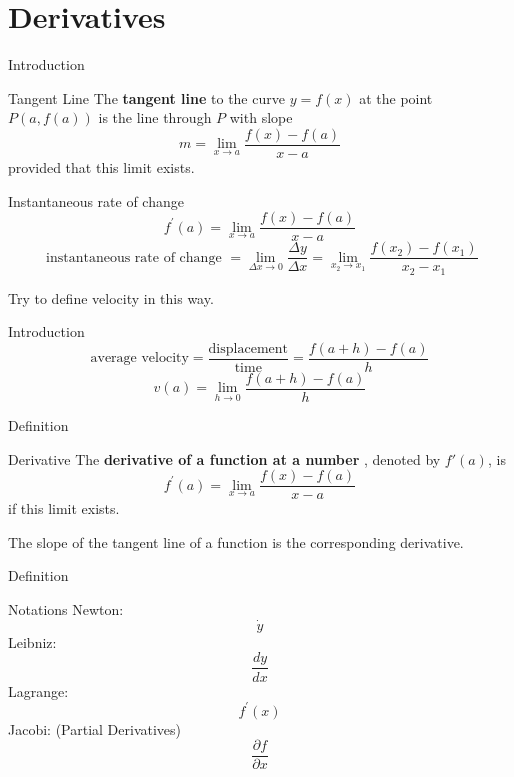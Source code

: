 
\section{Derivatives}


\begin{frame}{Introduction}
    \begin{block}{Tangent Line}
        The \textbf{tangent line} to the curve $y=f(x)$ at the point $P(a, f(a))$ is the line through $P$ with slope
        $$
            m=\lim _{x \rightarrow a} \frac{f(x)-f(a)}{x-a}
        $$
        provided that this limit exists.
    \end{block}
    \begin{block}{Instantaneous rate of change}
        $$
            f^{\prime}(a)=\lim _{x \rightarrow a} \frac{f(x)-f(a)}{x-a}
        $$$$
            \text { instantaneous rate of change }=\lim _{\Delta x \rightarrow 0} \frac{\Delta y}{\Delta x}=\lim _{x_{2} \rightarrow x_{1}} \frac{f\left(x_{2}\right)-f\left(x_{1}\right)}{x_{2}-x_{1}}
        $$
    \end{block}
    Try to define velocity in this way.
\end{frame}



\begin{frame}{Introduction}
    $$
        \text{average velocity} = \frac{\text{displacement}}{\text{time}} = \frac{f(a+h)-f(a)}{h}
    $$
    $$v(a)=\lim _{h\rightarrow 0}\frac{f(a+h)-f(a)}{h}$$
\end{frame}



\begin{frame}{Definition}
    \begin{block}{Derivative}
        The \textbf{derivative of a function  at a number }, denoted by $f'(a)$, is
        $$
            f^{\prime}(a)=\lim _{x \rightarrow a} \frac{f(x)-f(a)}{x-a}
        $$
        if this limit exists.
    \end{block}
    The slope of the tangent line of a function is the corresponding derivative.
\end{frame}



\begin{frame}{Definition}
    \begin{block}{Notations}
        Newton: $$
            \dot{y}
        $$
        Leibniz:
        $$
            \frac{d y}{d x}
        $$
        Lagrange:
        $$
            f^{\prime}(x)
        $$
        Jacobi: (Partial Derivatives)
        $$
            \frac{\partial f}{\partial x}
        $$
    \end{block}
\end{frame}




